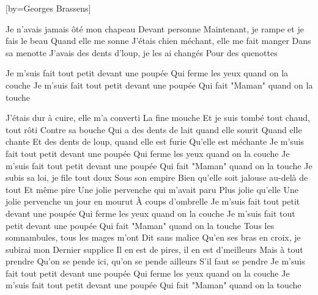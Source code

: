 [by={Georges Brassens}]

  \chordsoff
  
  \beginverse
  Je n'avais jamais ôté mon chapeau
  Devant personne
  Maintenant, je rampe et je fais le beau
  Quand elle me sonne
  J'étais chien méchant, elle me fait manger
  Dans sa menotte
  J'avais des dents d'loup, je les ai changés
  Pour des quenottes
  \endverse

  \beginchorus
  
  Je m'suis fait tout petit devant une poupée
  Qui ferme les yeux quand on la couche
  Je m'suis fait tout petit devant une poupée
  Qui fait "Maman" quand on la touche
  \endchorus
  
  \beginverse
  J'étais dur à cuire, elle m'a converti
  La fine mouche
  Et je suis tombé tout chaud, tout rôti
  Contre sa bouche
  Qui a des dents de lait quand elle sourit
  Quand elle chante
  Et des dents de loup, quand elle est furie
  Qu'elle est méchante
  \endverse
  \beginchorus
  Je m'suis fait tout petit devant une poupée
  Qui ferme les yeux quand on la couche
  Je m'suis fait tout petit devant une poupée
  Qui fait "Maman" quand on la touche
  \endchorus
  \beginverse
  Je subis sa loi, je file tout doux
  Sous son empire
  Bien qu'elle soit jalouse au-delà de tout
  Et même pire
  Une jolie pervenche qui m'avait paru
  Plus jolie qu'elle
  Une jolie pervenche un jour en mourut
  À coups d'ombrelle
  \endverse
  \beginchorus
  Je m'suis fait tout petit devant une poupée
  Qui ferme les yeux quand on la couche
  Je m'suis fait tout petit devant une poupée
  Qui fait "Maman" quand on la touche
  \endchorus
  \beginverse
  Tous les somnambules, tous les mages m'ont
  Dit sans malice
  Qu'en ses bras en croix, je subirai mon
  Dernier supplice
  Il en est de pires, il en est d'meilleurs
  Mais à tout prendre
  Qu'on se pende ici, qu'on se pende ailleurs
  S'il faut se pendre
  \endverse
  \beginchorus
  Je m'suis fait tout petit devant une poupée
  Qui ferme les yeux quand on la couche
  Je m'suis fait tout petit devant une poupée
  Qui fait "Maman" quand on la touche
  \endchorus

\endsong
